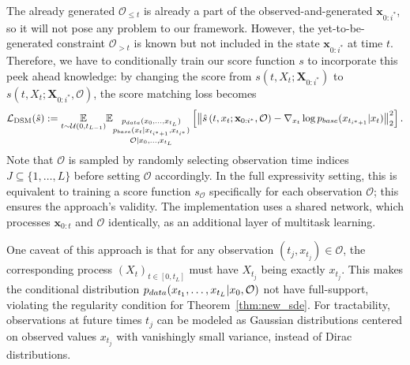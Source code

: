 \documentclass{article}
\newcommand{\pdata}{p_{\normalfont{data}}}
\newcommand{\pbase}{p_{\normalfont{base}}}
\begin{document}
The already generated $\mathcal{O}_{\le t}$ is already a part of the observed-and-generated $\mathbf{x}_{0:i^*}$, so it will not pose any problem to our framework. However, the yet-to-be-generated constraint $\mathcal{O}_{> t}$ is known but not included in the state $\mathbf{x}_{0:i^*}$ at time $t$. Therefore, we have to conditionally train our score function $s$ to incorporate this peek ahead knowledge: by changing the score from $s\left(t,X_t; \mathbf{X}_{0:i^*}\right)$ to $s\left(t,X_t; \mathbf{X}_{0:i^*}, \mathcal{O}\right)$, the score matching loss becomes
\begin{align}
    \mathcal{L}_{\text{DSM}}(\hat{s}) := \displaystyle \underset{t \sim \mathcal{U}(0, t_{L-1})}{\mathbb{E}} \mathbb{E}_{\substack{\pdata(x_0, \ldots, x_{t_L}) \\ \pbase(x_t | x_{t_{i^* + 1}}, x_{t_{i^*}})\\
    \mathcal{O} \vert x_0, \ldots, x_{t_L}}
    } \left[\left\|
    \hat{s}\left(t,x_t; \mathbf{x}_{0:i^*}, \mathcal{O}\right) - \nabla_{x_t} \log \pbase(x_{t_{i^* + 1}} | x_t)\right\|_2^2\right]\raisetag{12pt}\label{eqn:simplified_dsm_main_non_causal}.
\end{align}
Note that $\mathcal{O}$ is sampled by randomly selecting observation time indices $J \subseteq \{1, \dots, L\}$ before setting $\mathcal{O}$ accordingly. In the full expressivity setting, this is equivalent to training a score function $s_{\mathcal{O}}$ specifically for each observation $\mathcal{O}$; this ensures the approach's validity. The implementation uses a shared network, which processes $\mathbf{x}_{0:t}$ and $\mathcal{O}$ identically, as an additional layer of multitask learning.

One caveat of this approach is that for any observation $(t_j, x_{t_j}) \in \mathcal{O}$, the corresponding process $(X_t)_{t \in [0, t_L]}$ must have $X_{t_j}$ being exactly $x_{t_j}$. This makes the conditional distribution $\pdata(x_{t_1}, \dots, x_{t_L}\vert x_0, \mathcal{O})$ not have full-support, violating the regularity condition for Theorem~\ref{thm:new_sde}. For tractability, observations at future times $t_j$ can be modeled as Gaussian distributions centered on observed values $x_{t_j}$ with vanishingly small variance, instead of Dirac distributions.
\end{document}
